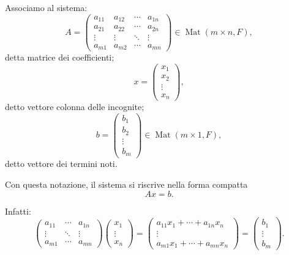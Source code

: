 \documentclass[a4paper]{article}
\begin{document}
Associamo al sistema:
\[
    A=
    \begin{pmatrix}
        a_{11} & a_{12} & \cdots & a_{1n}\\
        a_{21} & a_{22} & \cdots & a_{2n}\\
        \vdots & \vdots & \ddots & \vdots\\
        a_{m1} & a_{m2} & \cdots & a_{mn}
    \end{pmatrix}
    \in\operatorname{Mat}(m\times n,F),
\]
detta matrice dei coefficienti;
\[
    x=
    \begin{pmatrix}
        x_1\\
        x_2\\
        \vdots\\
        x_n
    \end{pmatrix},
\]
detto vettore colonna delle incognite;
\[
    b=
    \begin{pmatrix}
        b_1\\
        b_2\\
        \vdots\\
        b_m
    \end{pmatrix}
    \in\operatorname{Mat}(m\times 1,F),
\]
detto vettore dei termini noti.

Con questa notazione, il sistema si riscrive nella forma compatta
\[
    Ax=b.
\]

Infatti:
\[
    \begin{pmatrix}
        a_{11} & \cdots & a_{1n}\\
        \vdots & \ddots & \vdots\\
        a_{m1} & \cdots & a_{mn}
    \end{pmatrix}
    \begin{pmatrix}
        x_1\\
        \vdots\\
        x_n
    \end{pmatrix}
    =
    \begin{pmatrix}
        a_{11}x_1+\cdots+a_{1n}x_n\\
        \vdots\\
        a_{m1}x_1+\cdots+a_{mn}x_n
    \end{pmatrix}
    =
    \begin{pmatrix}
        b_1\\
        \vdots\\
        b_m
    \end{pmatrix}.
\]
\end{document}
